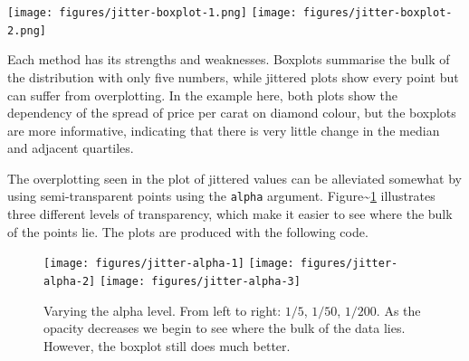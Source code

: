 \texttt{[image: figures/jitter-boxplot-1.png]}
\texttt{[image: figures/jitter-boxplot-2.png]}

Each method has its strengths and weaknesses. Boxplots summarise the
bulk of the distribution with only five numbers, while jittered plots
show every point but can suffer from overplotting. In the example here,
both plots show the dependency of the spread of price per carat on
diamond colour, but the boxplots are more informative, indicating that
there is very little change in the median and adjacent quartiles.

The overplotting seen in the plot of jittered values can be alleviated
somewhat by using semi-transparent points using the \texttt{alpha}
argument. Figure\textasciitilde{}\ref{fig:jitter-alpha} illustrates
three different levels of transparency, which make it easier to see
where the bulk of the points lie. The plots are produced with the
following code. 

\begin{Shaded}
\begin{Highlighting}[]
\StringTok{ }  \NormalTok{,}
  \NormalTok{(} \NormalTok{/}\StringTok{ }\NormalTok{))}
\StringTok{ }  \NormalTok{,}
  \NormalTok{(} \NormalTok{/}\StringTok{ }\NormalTok{))}
\StringTok{ }  \NormalTok{,}
  \NormalTok{(} \NormalTok{/}\StringTok{ }\NormalTok{))}
\end{Highlighting}
\end{Shaded}

\begin{figure}
\texttt{[image: figures/jitter-alpha-1]} \texttt{[image: figures/jitter-alpha-2]} \texttt{[image: figures/jitter-alpha-3]} \caption{Varying the alpha level.  From left to right: $1/5$, $1/50$, $1/200$.  As the opacity decreases we begin to see where the bulk of the data lies.  However, the boxplot still does much better.\label{fig:jitter-alpha}}
\end{figure}

